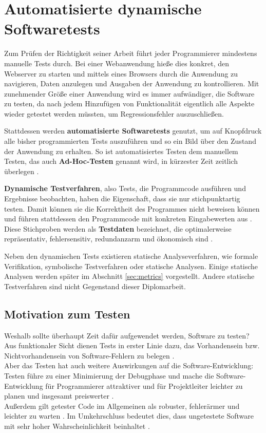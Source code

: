 \chapter{Automatisierte dynamische Softwaretests}
\label{sec:test}
Zum Prüfen der Richtigkeit seiner Arbeit führt jeder Programmierer mindestens manuelle Tests durch. Bei einer Webanwendung hieße dies konkret, den Webserver zu starten und mittels eines Browsers durch die Anwendung zu navigieren, Daten anzulegen und Ausgaben der Anwendung zu kontrollieren. Mit zunehmender Größe einer Anwendung wird es immer aufwändiger, die Software zu testen, da nach jedem Hinzufügen von Funktionalität eigentlich alle Aspekte wieder getestet werden müssten, um Regressionsfehler auszuschließen.

Stattdessen werden \textbf{automatisierte Softwaretests} genutzt, um auf Knopfdruck alle bisher programmierten Tests auszuführen und so ein Bild über den Zustand der Anwendung zu erhalten. So ist automatisiertes Testen dem manuellem Testen, das auch \textbf{Ad-Hoc-Testen} genannt wird, in kürzester Zeit zeitlich überlegen \citep[S.4]{rappin_rails_2011}.

\textbf{Dynamische Testverfahren}, also Tests, die Programmcode ausführen und Ergebnisse beobachten, haben die Eigenschaft, dass sie nur stichpunktartig testen. Damit können sie die Korrektheit des Programmes nicht beweisen können und führen stattdessen den Programmcode mit konkreten Eingabewerten aus \citep[S. 49]{liggesmeyer_modultest_1990}. Diese Stichproben werden als \textbf{Testdaten} bezeichnet, die optimalerweise repräsentativ, fehlersensitiv, redundanzarm und ökonomisch sind \citep[S. 51]{liggesmeyer_modultest_1990}.

Neben den dynamischen Tests existieren statische Analyseverfahren, wie formale Verifikation, symbolische Testverfahren oder statische Analysen. Einige statische Analysen werden später im Abschnitt \ref{sec:metrics} vorgestellt. Andere statische Testverfahren sind nicht Gegenstand dieser Diplomarbeit.

\section{Motivation zum Testen}
Weshalb sollte überhaupt Zeit dafür aufgewendet werden, Software zu testen?\\
Aus funktionaler Sicht dienen Tests in erster Linie dazu, das Vorhandensein bzw. Nichtvorhandensein von Software-Fehlern zu belegen \citep{goodliffe_code_2006}.\\
Aber das Testen hat auch weitere Auswirkungen auf die Software-Entwicklung: Testen führe zu einer Minimierung der Debugphase und mache die Software\hyp{}Entwicklung für Programmierer attraktiver und für Projektleiter leichter zu planen \citep{orsini_rails_2007} und insgesamt preiswerter \citep[S.13]{liggesmeyer_modultest_1990}.\\
Außerdem gilt getester Code im Allgemeinen als robuster, fehlerärmer und leichter zu warten \citep{rappin_rails_2011}. Im Umkehrschluss bedeutet dies, dass ungetestete Software mit sehr hoher Wahrscheinlichkeit  beinhaltet \citep{goodliffe_code_2006}.

